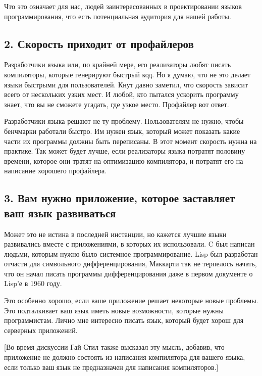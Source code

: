 \documentclass[ebook,12pt,oneside,openany]{memoir}
\begin{document}
Что это означает для нас, людей заинтересованных в проектировании
языков программирования, что есть потенциальная аудитория для нашей
работы. \newline

\subsection{2. Скорость приходит от профайлеров}

Разработчики языка или, по крайней мере, его реализаторы любят писать
компиляторы, которые генерируют быстрый код. Но я думаю, что не это
делает языки быстрыми для пользователей. Кнут давно заметил, что
скорость зависит всего от нескольких узких мест. И любой, кто пытался
ускорить программу знает, что вы не сможете угадать, где узкое место.
Профайлер вот ответ. \newline

Разработчики языка решают не ту проблему. Пользователям не нужно,
чтобы бенчмарки работали быстро. Им нужен язык, который может показать
какие части их программы должны быть переписаны. В этот момент
скорость нужна на практике. Так может будет лучше, если реализаторы
языка потратят половину времени, которое они тратят на оптимизацию
компилятора, и потратят его на написание хорошего профайлера. \newline

\subsection{3. Вам нужно приложение, которое заставляет ваш язык
  развиваться}

Может это не истина в последней инстанции, но кажется лучшие языки
развивались вместе с приложениями, в которых их использовали. C был
написан людьми, которым нужно было системное программирование. Lisp
был разработан отчасти для символьного дифференцирования, Маккарти так
не терпелось начать, что он начал писать программы дифференцирования
даже в первом документе о Lisp'е в 1960 году. \newline

Это особенно хорошо, если ваше приложение решает некоторые новые
проблемы. Это подталкивает ваш язык иметь новые возможности, которые
нужны программистам. Лично мне интересно писать язык, который будет
хорош для серверных приложений. \newline

[Во время дискуссии Гай Стил также высказал эту мысль, добавив, что
приложение не должно состоять из написания компилятора для вашего
языка, если только ваш язык не предназначен для написания
компиляторов.] \newline
\end{document}
